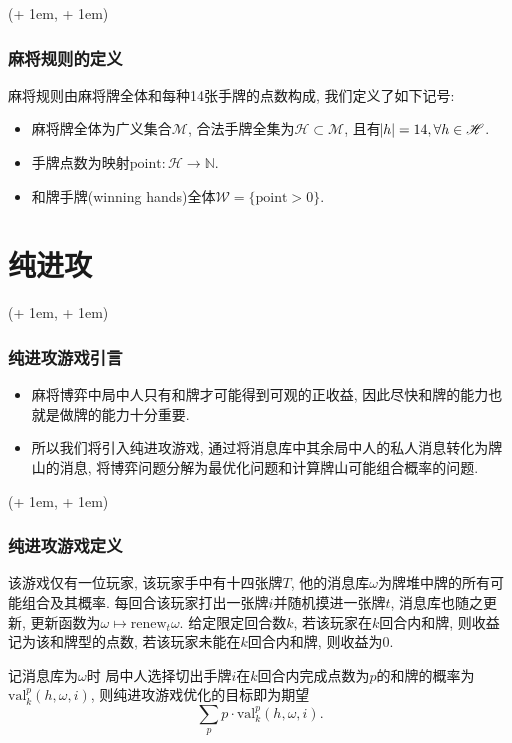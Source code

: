 \documentclass[xcolor=dvipsnames]{ctexbeamer}
\newcommand{\FrameTextCrono}[1]{
    \begin{textblock*}{\paperwidth}(\textwidth + 1em, \textheight + 1em)
        #1
    \end{textblock*}
}
\let\oldframe\frame
\let\oldendframe\endframe
\renewenvironment{frame}
    {\oldframe\FrameTextCrono{\small\color{blue}{\crono}}}
    {\oldendframe}
\newcommand{\mahjong}{\mathscr{M}}
\newcommand{\point}{\mathrm{point}}
\newcommand{\Hand}{\mathscr{H}}
\newcommand{\hand}{h}
\newcommand{\base}{\omega}
\begin{document}
    \begin{frame}
        \frametitle{麻将规则的定义}
        \begin{definition}[麻将规则]
            麻将规则由麻将牌全体和每种14张手牌的点数构成, 我们定义了如下记号:
            \begin{itemize}
                \item 麻将牌全体为广义集合$\mahjong$,
                    合法手牌全集为$\Hand\subset\mahjong$,
                    且有$\abs{\hand}=14, \forall{\hand\in\Hand}$.
                \item 手牌点数为映射$\point: \Hand\rightarrow\mathbb{N}$.
                \item 和牌手牌(winning hands)全体$\mathscr{W}=\{\point>0\}$.
            \end{itemize}
        \end{definition}
    \end{frame}

    \section{纯进攻}

    \begin{frame}
        \frametitle{纯进攻游戏引言}
        \begin{itemize}
            \item 麻将博弈中局中人只有和牌才可能得到可观的正收益,
                因此尽快和牌的能力也就是做牌的能力十分重要.
            \item 所以我们将引入纯进攻游戏,
                通过将消息库中其余局中人的私人消息转化为牌山的消息,
                将博弈问题分解为最优化问题和计算牌山可能组合概率的问题.
        \end{itemize}
    \end{frame}

    \begin{frame}
        \frametitle{纯进攻游戏定义}
        \begin{definition}[纯进攻游戏]
            该游戏仅有一位玩家, 该玩家手中有十四张牌$T$,
            他的消息库$\base$为牌堆中牌的所有可能组合及其概率.
            每回合该玩家打出一张牌$i$并随机摸进一张牌$t$, 消息库也随之更新,
            更新函数为$\base\mapsto\mathrm{renew}_t{\base}$.
            给定限定回合数$k$,
            若该玩家在$k$回合内和牌, 则收益记为该和牌型的点数,
            若该玩家未能在$k$回合内和牌, 则收益为0.
        \end{definition}
        记消息库为$\base$时
        局中人选择切出手牌$i$在$k$回合内完成点数为$p$的和牌的概率为
        $\mathrm{val}_{k}^{p}(\hand, \base, i)$,
        则纯进攻游戏优化的目标即为期望
        \[\sum_{p}{p\cdot\mathrm{val}_{k}^{p}(\hand, \base, i)}.\]
    \end{frame}
\end{document}
